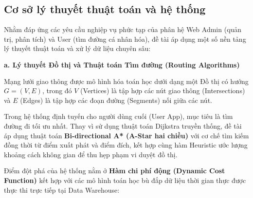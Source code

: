 \subsection{Cơ sở lý thuyết thuật toán và hệ thống}

Nhằm đáp ứng các yêu cầu nghiệp vụ phức tạp của phân hệ Web Admin (quản trị, phân tích) và User (tìm đường cá nhân hóa), đề tài áp dụng một số nền tảng lý thuyết thuật toán và xử lý dữ liệu chuyên sâu:

\textbf{a. Lý thuyết Đồ thị và Thuật toán Tìm đường (Routing Algorithms)}

Mạng lưới giao thông được mô hình hóa toán học dưới dạng một Đồ thị có hướng $G = (V, E)$, trong đó $V$ (Vertices) là tập hợp các nút giao thông (Intersections) và $E$ (Edges) là tập hợp các đoạn đường (Segments) nối giữa các nút.

Trong hệ thống định tuyến cho người dùng cuối (User App), mục tiêu là tìm đường đi tối ưu nhất. Thay vì sử dụng thuật toán Dijkstra truyền thống, đề tài áp dụng thuật toán \textbf{Bi-directional A* (A-Star hai chiều)} với cơ chế tìm kiếm đồng thời từ điểm xuất phát và điểm đích, kết hợp cùng hàm Heuristic ước lượng khoảng cách không gian để thu hẹp phạm vi duyệt đồ thị. 

Điểm đột phá của hệ thống nằm ở \textbf{Hàm chi phí động (Dynamic Cost Function)} kết hợp với các mô hình toán học bù đắp dữ liệu thời gian thực được thực thi trực tiếp tại Data Warehouse:

